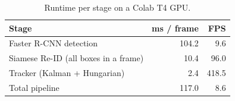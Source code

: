 \begin{table}[h]
\caption{Runtime per stage on a Colab T4 GPU.}
\label{tab:speed}
\begin{tabular}{lrr}
\toprule
Stage & ms / frame & FPS \\
\midrule
Faster R-CNN detection & 104.2 & 9.6 \\
Siamese Re-ID (all boxes in a frame) & 10.4 & 96.0 \\
Tracker (Kalman + Hungarian) & 2.4 & 418.5 \\
Total pipeline & 117.0 & 8.6 \\
\bottomrule
\end{tabular}
\end{table}
